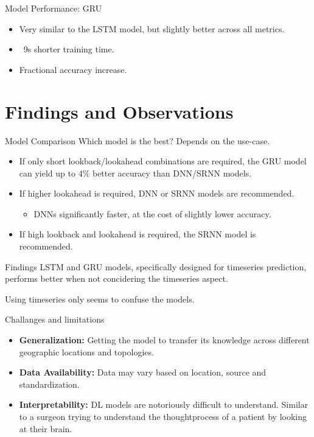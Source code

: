 \documentclass[10pt]{beamer}
\begin{document}
\begin{frame}{Model Performance: GRU}
\begin{itemize}
	\item Very similar to the LSTM model, but slightly better across all metrics.
	\item ~9s shorter training time.
	\item Fractional accuracy increase.
\end{itemize}
\end{frame}


\section{Findings and Observations}


\begin{frame}{Model Comparison}
Which model is the best? Depends on the use-case.
\begin{itemize}
	\item If only short lookback/lookahead combinations are required, the GRU model can yield up to 4\% better accuracy than DNN/SRNN models.
	\item If higher lookahead is required, DNN or SRNN models are recommended.
	\begin{itemize}
		\item DNNs significantly faster, at the cost of slightly lower accuracy.
	\end{itemize}
	\item If high lookback and lookahead is required, the SRNN model is recommended.
\end{itemize}
\end{frame}


\begin{frame}{Findings}
LSTM and GRU models, specifically designed for timeseries prediction, performs better when not concidering the timeseries aspect.
\par
Using timeseries only seems to confuse the models.
\end{frame}


\begin{frame}{Challanges and limitations}
\begin{itemize}
	\item \textbf{Generalization:} Getting the model to transfer its knowledge across different geographic locations and topologies.
	\item \textbf{Data Availability:} Data may vary based on location, source and standardization.
	\item \textbf{Interpretability:} DL models are notoriously difficult to understand. Similar to a surgeon trying to understand the thoughtprocess of a patient by looking at their brain.
\end{itemize}
\end{frame}
\end{document}
